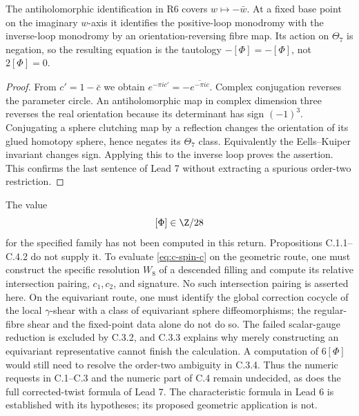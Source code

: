 \begin{proposition}
The antiholomorphic identification in R6 covers
$w\mapsto-\bar w$. At a fixed base point on the imaginary
$w$-axis it identifies the positive-loop monodromy with the
inverse-loop monodromy by an orientation-reversing fibre map.
Its action on $\Theta_7$ is negation, so the resulting equation is
the tautology $-[\Phi]=-[\Phi]$, not $2[\Phi]=0$.
\end{proposition}

\begin{proof}
From $c'=1-\bar c$ we obtain
$e^{-\pi ic'}=-\overline{e^{-\pi ic}}$.
Complex conjugation reverses the parameter circle. An
antiholomorphic map in complex dimension three reverses the real
orientation because its determinant has sign $(-1)^3$.
Conjugating a sphere clutching map by a reflection changes the
orientation of its glued homotopy sphere, hence negates its
$\Theta_7$ class. Equivalently the Eells--Kuiper invariant changes
sign. Applying this to the inverse loop proves the assertion.
This confirms the last sentence of Lead 7 without extracting a
spurious order-two restriction.
\end{proof}

\begin{problem}
The value
\[
 [\Phi]\in\Z/28
\]
for the specified family has not been computed in this return.
Propositions C.1.1--C.4.2 do not supply it. To evaluate
\eqref{eq:c-spin-c} on the geometric route, one must construct the
specific resolution $W_8$ of a descended filling and compute its
relative intersection pairing, $c_1,c_2$, and signature. No such
intersection pairing is asserted here. On the equivariant route,
one must identify the global correction cocycle of the local
$\gamma$-shear with a class of equivariant sphere diffeomorphisms;
the regular-fibre shear and the fixed-point data alone do not do so.
The failed scalar-gauge reduction is excluded by C.3.2, and
C.3.3 explains why merely constructing an equivariant representative
cannot finish the calculation. A computation of $6[\Phi]$ would
still need to resolve the order-two ambiguity in C.3.4. Thus the
numeric requests in C.1--C.3 and the numeric part of C.4 remain
undecided, as does the full corrected-twist formula of Lead 7.
The characteristic formula in Lead 6 is established with its
hypotheses; its proposed geometric application is not.
\end{problem}
